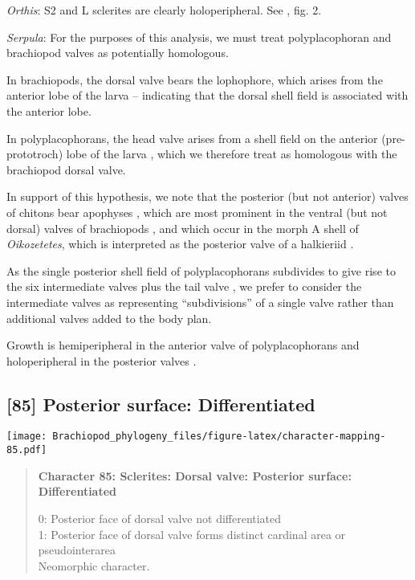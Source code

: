 \documentclass[openany]{book}
\theoremstyle{definition}
\theoremstyle{definition}
\theoremstyle{definition}
\theoremstyle{remark}
\begin{document}
\hypertarget{Orthis-coding-84}{}
\emph{Orthis}: S2 and L sclerites are clearly holoperipheral. See
\citet{Larsson2014iPaterimitra}, fig. 2.

\hypertarget{Serpula-coding-84}{}
\emph{Serpula}: For the purposes of this analysis, we must treat
polyplacophoran and brachiopod valves as potentially homologous.

In brachiopods, the dorsal valve bears the lophophore, which arises from
the anterior lobe of the larva \citep{Altenburger2013} -- indicating
that the dorsal shell field is associated with the anterior lobe.

In polyplacophorans, the head valve arises from a shell field on the
anterior (pre-prototroch) lobe of the larva \citep{Wanninger2002C},
which we therefore treat as homologous with the brachiopod dorsal valve.

In support of this hypothesis, we note that the posterior (but not
anterior) valves of chitons bear apophyses
\citep{Schwabe2010, Connors2012}, which are most prominent in the
ventral (but not dorsal) valves of brachiopods \citep[fig.
322]{Williams1997Introduction}, and which occur in the morph A shell of
\emph{Oikozetetes}, which is interpreted as the posterior valve of a
halkieriid \citep{Paterson2009}.

As the single posterior shell field of polyplacophorans subdivides to
give rise to the six intermediate valves plus the tail valve
\citep{Wanninger2002C}, we prefer to consider the intermediate valves as
representing ``subdivisions'' of a single valve rather than additional
valves added to the body plan.

Growth is hemiperipheral in the anterior valve of polyplacophorans and
holoperipheral in the posterior valves \citep{Schwabe2010, Connors2012}.

\subsection*{{[}85{]} Posterior surface:
Differentiated}\label{posterior-surface-differentiated}

\texttt{[image: Brachiopod\_phylogeny\_files/figure-latex/character-mapping-85.pdf]}

\begin{quote}
\textbf{Character 85: Sclerites: Dorsal valve: Posterior surface:
Differentiated}

0: Posterior face of dorsal valve not differentiated\\
1: Posterior face of dorsal valve forms distinct cardinal area or
pseudointerarea\\
Neomorphic character.
\end{quote}
\end{document}
